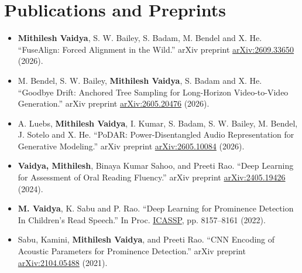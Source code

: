 \documentclass[10pt,letterpaper,sans]{moderncv}
\begin{document}
\section{Publications and Preprints}
\begin{itemize}
    \item \textbf{Mithilesh Vaidya}, S. W. Bailey, S. Badam, M. Bendel and X. He. ``FuseAlign: Forced Alignment in the Wild.'' arXiv preprint \href{https://arxiv.org/abs/2609.33650}{arXiv:2609.33650} (2026).
    \item M. Bendel, S. W. Bailey, \textbf{Mithilesh Vaidya}, S. Badam and X. He. ``Goodbye Drift: Anchored Tree Sampling for Long-Horizon Video-to-Video Generation.'' arXiv preprint \href{https://arxiv.org/abs/2605.20476}{arXiv:2605.20476} (2026).
    \item A. Luebs, \textbf{Mithilesh Vaidya}, I. Kumar, S. Badam, S. W. Bailey, M. Bendel, J. Sotelo and X. He. ``PoDAR: Power-Disentangled Audio Representation for Generative Modeling.'' arXiv preprint \href{https://arxiv.org/abs/2605.10084}{arXiv:2605.10084} (2026).
    \item \textbf{Vaidya, Mithilesh}, Binaya Kumar Sahoo, and Preeti Rao. ``Deep Learning for Assessment of Oral Reading Fluency.'' arXiv preprint \href{https://arxiv.org/abs/2405.19426}{arXiv:2405.19426} (2024).
    \item \textbf{M. Vaidya}, K. Sabu and P. Rao. ``Deep Learning for Prominence Detection In Children's Read Speech.'' In Proc. \href{https://doi.org/10.1109/ICASSP43922.2022.9747780}{ICASSP}, pp. 8157--8161 (2022).
    \item Sabu, Kamini, \textbf{Mithilesh Vaidya}, and Preeti Rao. ``CNN Encoding of Acoustic Parameters for Prominence Detection.'' arXiv preprint \href{https://arxiv.org/abs/2104.05488}{arXiv:2104.05488} (2021).
\end{itemize}
\vspace{-10pt}
\end{document}
